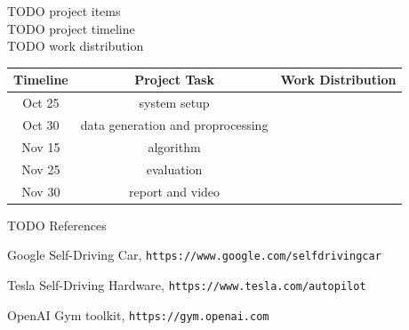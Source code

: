 \documentclass[a4paper]{article}
\begin{document}
TODO project items\\
TODO project timeline\\
TODO work distribution\\

\begin{center}
    \begin{tabular}{ | c | c | c | } 
        \hline
        Timeline & Project Task & Work Distribution   \\ 
        \hline
        Oct 25   & system setup &   \\ 
        \hline
        Oct 30   & data generation and proprocessing &   \\ 
        \hline
        Nov 15   & algorithm  &   \\ 
        \hline
        Nov 25   & evaluation  &   \\ 
        \hline
        Nov 30   & report and video  &   \\ 
        \hline
    \end{tabular}
\end{center}


TODO References\\


\begin{thebibliography}{9}
  Google Self-Driving Car, \texttt{https://www.google.com/selfdrivingcar}

  Tesla Self-Driving Hardware, \texttt{https://www.tesla.com/autopilot}

  OpenAI Gym toolkit, \texttt{https://gym.openai.com}

\end{thebibliography}
\end{document}
